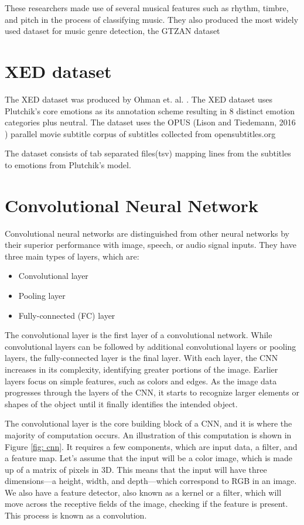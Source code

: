 These researchers made use of several musical features such as rhythm, timbre, and pitch in the process of classifying music. They also produced the most widely used dataset for music genre detection, the GTZAN dataset \cite{gtzan_dataset}

\section{XED dataset}
The XED dataset was produced by Ohman et. al. \cite{ohman-etal-2020-xed}. The XED dataset uses Plutchik’s core emotions as its annotation scheme resulting in 8 distinct emotion categories plus neutral. The dataset uses the OPUS (Lison and Tiedemann, 2016 \cite{opensubtitles2016}) parallel movie subtitle corpus of subtitles collected from opensubtitles.org \newline

The dataset consists of tab separated files(tsv) mapping lines from the subtitles to emotions from Plutchik’s model.

\section{Convolutional Neural Network}
Convolutional neural networks are distinguished from other neural networks by their superior performance with image, speech, or audio signal inputs. They have three main types of layers, which are:
\begin{itemize}
	\item Convolutional layer
	\item Pooling layer
	\item Fully-connected (FC) layer
\end{itemize}

The convolutional layer is the first layer of a convolutional network. While convolutional layers can be followed by additional convolutional layers or pooling layers, the fully-connected layer is the final layer. With each layer, the CNN increases in its complexity, identifying greater portions of the image. Earlier layers focus on simple features, such as colors and edges. As the image data progresses through the layers of the CNN, it starts to recognize larger elements or shapes of the object until it finally identifies the intended object.\newline

The convolutional layer is the core building block of a CNN, and it is where the majority of computation occurs. An illustration of this computation is shown in Figure \ref{fig: cnn}. It requires a few components, which are input data, a filter, and a feature map. Let’s assume that the input will be a color image, which is made up of a matrix of pixels in 3D. This means that the input will have three dimensions—a height, width, and depth—which correspond to RGB in an image. We also have a feature detector, also known as a kernel or a filter, which will move across the receptive fields of the image, checking if the feature is present. This process is known as a convolution.

